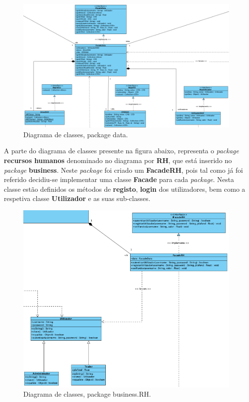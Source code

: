 \documentclass[11pt,a4paper]{report}%
\begin{document}
\begin{figure}[H]
	\centering
	\includegraphics[scale=0.5]{diagrama-classes-1.png}
	\caption{Diagrama de classes, package data. }
	\label{img:pag}
\end{figure}

\newpage

A parte do diagrama de classes presente na figura abaixo, representa o \emph{package} \textbf{recursos humanos} denominado no diagrama por \textbf{RH}, que está inserido no \emph{package} \textbf{business}. Neste \emph{package} foi criado um \textbf{FacadeRH}, pois tal como já foi referido decidiu-se implementar uma classe \textbf{Facade} para cada \emph{package}. Nesta classe estão definidos os métodos de \textbf{registo}, \textbf{login} dos utilizadores, bem como a respetiva classe \textbf{Utilizador} e as suas sub-classes.

\begin{figure}[H]
	\centering
	\includegraphics[scale=0.5]{diagrama-classes-2.png}
	\caption{Diagrama de classes, package business.RH. }
	\label{img:pag}
\end{figure}
\end{document}
